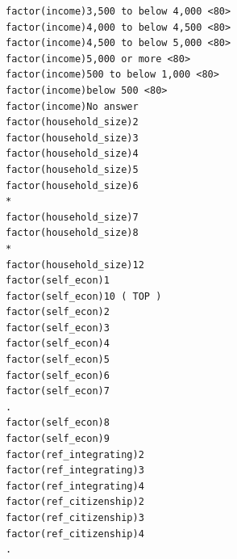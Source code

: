 \documentclass[
]{article}
\begin{document}
\begin{table}
\begin{minipage}[t]{\linewidth}
{\begin{verbatim}
factor(income)3,500 to below 4,000 <80>                                              
factor(income)4,000 to below 4,500 <80>                                              
factor(income)4,500 to below 5,000 <80>                                              
factor(income)5,000 or more <80>                                                     
factor(income)500 to below 1,000 <80>                                                
factor(income)below 500 <80>                                                         
factor(income)No answer                                                              
factor(household_size)2                                                              
factor(household_size)3                                                              
factor(household_size)4                                                              
factor(household_size)5                                                              
factor(household_size)6                                                           *  
factor(household_size)7                                                              
factor(household_size)8                                                           *  
factor(household_size)12                                                             
factor(self_econ)1                                                                   
factor(self_econ)10 ( TOP )                                                          
factor(self_econ)2                                                                   
factor(self_econ)3                                                                   
factor(self_econ)4                                                                   
factor(self_econ)5                                                                   
factor(self_econ)6                                                                   
factor(self_econ)7                                                                .  
factor(self_econ)8                                                                   
factor(self_econ)9                                                                   
factor(ref_integrating)2                                                             
factor(ref_integrating)3                                                             
factor(ref_integrating)4                                                             
factor(ref_citizenship)2                                                             
factor(ref_citizenship)3                                                             
factor(ref_citizenship)4                                                          .  

\end{verbatim}}
\end{minipage}
\end{table}
\end{document}
